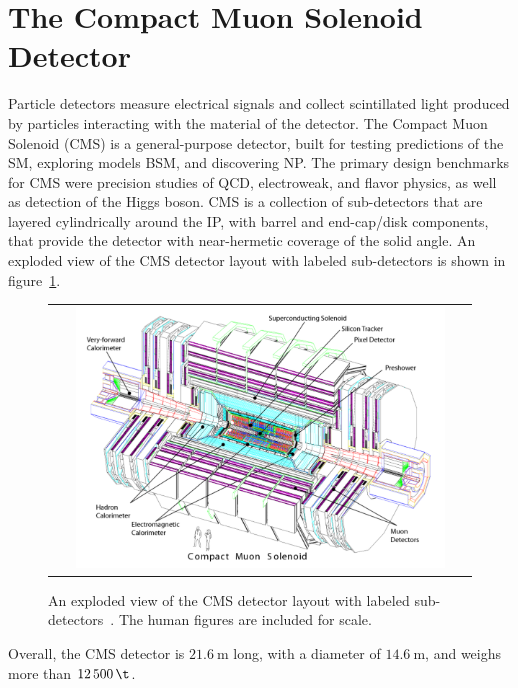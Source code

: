 \section{The Compact Muon Solenoid Detector}
Particle detectors measure electrical signals and collect scintillated light produced by particles interacting with the material of the detector.
The Compact Muon Solenoid (CMS) is a general-purpose detector, built for testing predictions of the SM, exploring models BSM, and discovering NP.
The primary design benchmarks for CMS were precision studies of QCD, electroweak, and flavor physics, as well as detection of the Higgs boson.
CMS is a collection of sub-detectors that are layered cylindrically around the IP, with barrel and end-cap/disk components, that provide the detector with near-hermetic coverage of the solid angle.
An exploded view of the CMS detector layout with labeled sub-detectors is shown in figure~\ref{CMS_Detector}.
\begin{figure}[!htb]
  \begin{center}
    \begin{tabular}{c}
        \includegraphics[width=0.9\textwidth]{fig_LHC_CMS/CMS_Detector.pdf}
    \end{tabular}
    \caption{An exploded view of the CMS detector layout with labeled sub-detectors~\cite{Bayatian:922757}.
            The human figures are included for scale.
            }
    \label{CMS_Detector}
  \end{center}
\end{figure}
Overall, the CMS detector is $\SI{21.6}{\m}$ long, with a diameter of $\SI{14.6}{\m}$, and weighs more than $\SI{12500}{\t}$.


